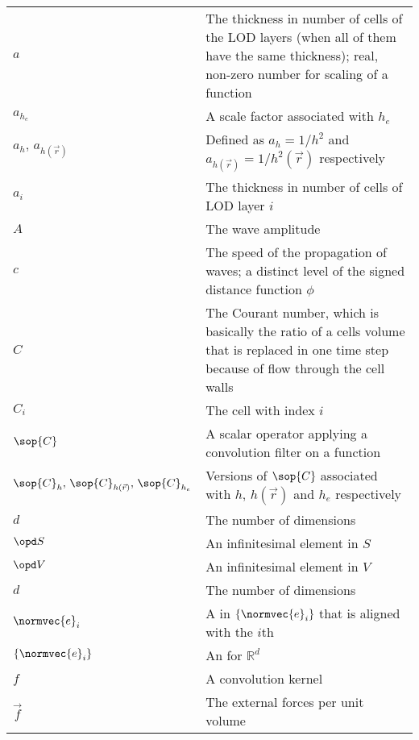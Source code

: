 {\begin{center}
\begin{longtabu}{l X}
    $a$                 & The thickness in number of cells of the LOD layers
                          (when all of them have the same thickness);
                          real, non-zero number for scaling of a function \\
    $a_{h_e}$           & A scale factor associated with $h_e$ \\
    $a_h,\,a_{h(\vec{r})}$      & Defined as $a_h = 1/h^2$ and $a_{h(\vec{r})} = 1/h^2(\vec{r})$
                                  respectively \\
    $a_i$               & The thickness in number of cells of LOD layer $i$ \\
    $A$                 & The wave amplitude \\
    $c$                 & The speed of the propagation of waves;
                          a distinct level of the signed distance function $\phi$ \\
    $C$                 & The Courant number, which is basically the ratio of a cells volume that
                          is replaced in one time step because of flow through the cell walls \\
    $C_i$               & The cell with index $i$ \\
    $\sop{C}$           & A scalar operator applying a convolution filter on a function \\
    $\sop{C}_h,\,\sop{C}_{h(\vec{r})},\,\sop{C}_{h_e}$ & Versions of $\sop{C}$ associated with $h$,
                                                         $h(\vec{r})$ and $h_e$ respectively \\
    $d$                 & The number of dimensions \\
    $\opd S$            & An infinitesimal element in $S$ \\
    $\opd V$            & An infinitesimal element in $V$ \\
    $d$                 & The number of dimensions \\
    $\normvec{e}_i$     & A  in $\{\normvec{e}_i\}$ that is aligned
                          with the $i$th  \\
    $\{\normvec{e}_i\}$ & An  for $\mathbb{R}^d$ \\
    $f$                 & A convolution kernel \\
    $\vec{f}$           & The external forces per unit volume \\

\end{longtabu}
\end{center}}

